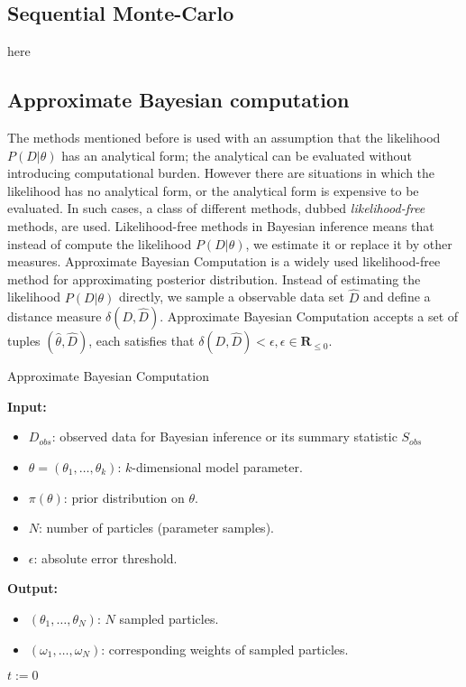 \subsection{Sequential Monte-Carlo}
here \cite{daviet2018inference} \cite{silk2012optimizing}

\subsection{Approximate Bayesian computation}
The methods mentioned before is used with an assumption that the likelihood $P(D|\theta)$ has an analytical form; the analytical can be evaluated without introducing computational burden. However there are situations in which the likelihood has no analytical form, or the analytical form is expensive to be evaluated. In such cases, a class of different methods, dubbed \textit{likelihood-free} methods, are used. Likelihood-free methods in Bayesian inference means that instead of compute the likelihood $P(D|\theta)$, we estimate it or replace it by other measures. Approximate Bayesian Computation is a widely used likelihood-free method for approximating posterior distribution. Instead of estimating the likelihood $P(D|\theta)$ directly, we sample a observable data set $\hat{D}$ and define a distance measure $\delta(D, \hat{D})$. Approximate Bayesian Computation accepts a set of tuples $(\hat{\theta}, \hat{D})$, each satisfies that $\delta(D, \hat{D}) < \epsilon, \epsilon\in\mathbf{R}_{\leq 0}$.
\begin{algorithm}[H]
    \caption{Approximate Bayesian Computation}
    \label{abcalg}
    \hspace*{\algorithmicindent} \textbf{Input:}
    \begin{itemize}
        \item $D_{obs}$: observed data for Bayesian inference or its summary statistic $S_{obs}$
        \item $\theta=(\theta_1,\ldots,\theta_k)$: $k$-dimensional model parameter.
        \item $\pi(\theta)$: prior distribution on $\theta$.
        \item $N$: number of particles (parameter samples).
        \item $\epsilon$: absolute error threshold.
    \end{itemize}
    \hspace*{\algorithmicindent} \textbf{Output:}
    \begin{itemize}
        \item $(\theta_1,\ldots,\theta_N)$: $N$ sampled particles.
        \item $(\omega_1,\ldots,\omega_N)$: corresponding weights of sampled particles.
    \end{itemize}
    \begin{algorithmic}[1]
        \State $t:=0$
        \EndWhile
        \EndProcedure
    \end{algorithmic}
\end{algorithm}



